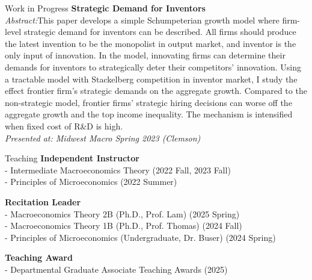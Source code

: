 \documentclass{cv} %
\begin{document}
\begin{rSection}{Work in Progress}
\medskip
{\bf Strategic Demand for Inventors} \\
	 \begin{adjustbox}{minipage=0.95\textwidth, right}
		\vspace{0.3em} {\emph{Abstract:}This paper develops a simple Schumpeterian growth model where firm-level strategic demand for inventors can be described.  All firms should produce the latest invention to be the monopolist in output market, and inventor is the only input of innovation.  In the model, innovating firms can determine their demands for inventors to strategically deter their competitors' innovation.  Using a tractable model with Stackelberg competition in inventor market,  I study the effect frontier firm's strategic demands on the aggregate growth.  Compared to the non-strategic model,  frontier firms' strategic hiring decisions can worse off the aggregate growth and the top income inequality.  The mechanism is intensified when fixed cost of R\&D is high.} \\
		\emph{Presented at: Midwest Macro Spring 2023 (Clemson)}
	\end{adjustbox}\\

\end{rSection}
\bigskip

\begin{rSection}{Teaching}
	{\bf Independent Instructor} \\
	\begin{adjustbox}{minipage=0.95\textwidth, right}
		\vspace{0.3em} 
		- Intermediate Macroeconomics Theory (2022 Fall, 2023 Fall) \\
		- Principles of Microeconomics (2022 Summer) 
	\end{adjustbox}

	\medskip
	{\bf Recitation Leader} \\
	\begin{adjustbox}{minipage=0.95\textwidth, right}
		\vspace{0.3em} 
		- Macroeconomics Theory 2B (Ph.D., Prof. Lam) (2025 Spring) \\
		- Macroeconomics Theory 1B (Ph.D., Prof. Thomas) (2024 Fall) \\
		- Principles of Microeconomics (Undergraduate, Dr. Buser) (2024 Spring)
	\end{adjustbox}

	\medskip
	{\bf Teaching Award} \\
	\begin{adjustbox}{minipage=0.95\textwidth, right}
		\vspace{0.3em} 
		- Departmental Graduate Associate Teaching Awards (2025)
	\end{adjustbox}
\end{rSection}
\end{document}
